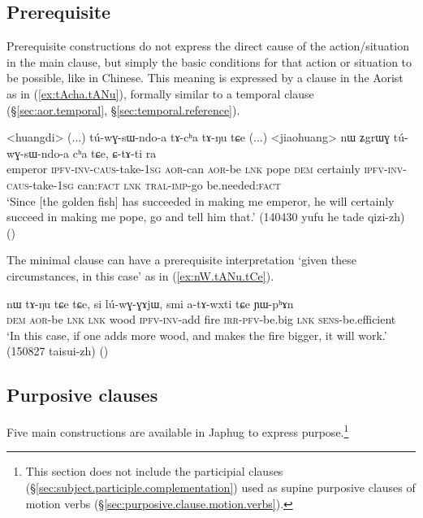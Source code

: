\subsection{Prerequisite} \label{sec:prerequisite.clause}
Prerequisite constructions do not express the direct cause of the action/situation in the main clause, but simply the basic conditions for that action or situation to be possible, like  in Chinese. This meaning is expressed by a clause in the Aorist as in (\ref{ex:tAcha.tANu}), formally similar to a temporal clause (§\ref{sec:aor.temporal}, §\ref{sec:temporal.reference}).

\begin{exe}
\ex \label{ex:tAcha.tANu}
\gll <huangdi> (...) tú-wɣ-sɯ-ndo-a tɤ-cʰa tɤ-ŋu tɕe (...) <jiaohuang> nɯ ʑgrɯɣ tú-wɣ-sɯ-ndo-a cʰa tɕe, ɕ-tɤ-ti ra \\
emperor {  } \textsc{ipfv}-\textsc{inv}-\textsc{caus}-take-\textsc{1sg} \textsc{aor}-can \textsc{aor}-be \textsc{lnk} {  } pope \textsc{dem} certainly \textsc{ipfv}-\textsc{inv}-\textsc{caus}-take-\textsc{1sg} can:\textsc{fact} \textsc{lnk} \textsc{tral}-\textsc{imp}-go be.needed:\textsc{fact} \\
\glt `Since [the golden fish] has succeeded in making me emperor, he will certainly succeed in making me pope, go and tell him that.' (140430 yufu he tade qizi-zh)
()
\end{exe}

The minimal clause  can have a prerequisite interpretation `given these circumstances, in this case' as in (\ref{ex:nW.tANu.tCe}).

\begin{exe}
\ex \label{ex:nW.tANu.tCe}
\gll nɯ tɤ-ŋu tɕe tɕe, si lú-wɣ-ɣɤjɯ, smi a-tɤ-wxti tɕe ɲɯ-pʰɤn \\
\textsc{dem} \textsc{aor}-be \textsc{lnk} \textsc{lnk} wood \textsc{ipfv}-\textsc{inv}-add fire \textsc{irr}-\textsc{pfv}-be.big \textsc{lnk} \textsc{sens}-be.efficient \\
\glt `In this case, if one adds more wood, and makes the fire bigger, it will work.' (150827 taisui-zh)
()
\end{exe}


 \subsection{Purposive clauses} \label{sec:purposive.clauses}
 Five main constructions are available in Japhug to express purpose.\footnote{This section does not include the  participial clauses (§\ref{sec:subject.participle.complementation}) used as supine purposive clauses of motion verbs  (§\ref{sec:purposive.clause.motion.verbs}).
 }

